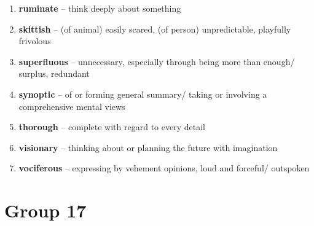\begin{enumerate}[wide,labelindent=0pt]
\item \textbf{ruminate} -- think deeply about something
\item \textbf{skittish} -- (of animal) easily scared, (of person) unpredictable, playfully frivolous
\item \textbf{superfluous} -- unnecessary, especially through being more than enough/ surplus, redundant
\item \textbf{synoptic} -- of or forming general summary/ taking or involving a comprehensive mental views
\item \textbf{thorough} -- complete with regard to every detail
\item \textbf{visionary} -- thinking about or planning the future with imagination
\item \textbf{vociferous} -- expressing by vehement opinions, loud and forceful/ outspoken
\end{enumerate}

\newpage
\section{Group 17}

